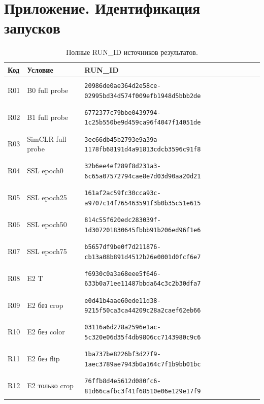 \section*{Приложение. Идентификация запусков}
\begingroup\small{}
\begin{longtable}{@{}l>{\raggedright\arraybackslash}p{3.5cm}p{10.8cm}@{}}
\caption{Полные RUN\_ID источников результатов.}\\
\toprule Код & Условие & RUN\_ID \\ \midrule \endhead
\hypertarget{R01}{R01} & B0 full probe & {\fontsize{8.8}{11}\selectfont\texttt{20986de0ae364d2e58ce-02995bd34d574f009efb1948d5bbb2de}} \\
\hypertarget{R02}{R02} & B1 full probe & {\fontsize{8.8}{11}\selectfont\texttt{6772377c79bbe0439794-1c25b550be9d459ca96f4047f14051de}} \\
\hypertarget{R03}{R03} & SimCLR full probe & {\fontsize{8.8}{11}\selectfont\texttt{3ec66db45b2793e9a39a-1178fb68191d4a91813cdcb3596c91f8}} \\
\hypertarget{R04}{R04} & SSL epoch0 & {\fontsize{8.8}{11}\selectfont\texttt{32b6ee4ef289f8d231a3-6c65a07572794cae8e7d03d90aa20d21}} \\
\hypertarget{R05}{R05} & SSL epoch25 & {\fontsize{8.8}{11}\selectfont\texttt{161af2ac59fc30cca93c-a9707c14f765463591f3b0b35c51e615}} \\
\hypertarget{R06}{R06} & SSL epoch50 & {\fontsize{8.8}{11}\selectfont\texttt{814c55f620edc283039f-1d307201830645fbbb91b206ed96f1e6}} \\
\hypertarget{R07}{R07} & SSL epoch75 & {\fontsize{8.8}{11}\selectfont\texttt{b5657df9be0f7d211876-cb13a08b891d4512b26e0001d0fcf6e7}} \\
\hypertarget{R08}{R08} & E2 T & {\fontsize{8.8}{11}\selectfont\texttt{f6930c0a3a68eee5f646-633b0a71ee11487bbda64c3c2b30dfa7}} \\
\hypertarget{R09}{R09} & E2 без crop & {\fontsize{8.8}{11}\selectfont\texttt{e0d41b4aae60ede11d38-9215f50ca3ca44209c28a2caef62eb66}} \\
\hypertarget{R10}{R10} & E2 без color & {\fontsize{8.8}{11}\selectfont\texttt{03116a6d278a2596e1ac-5c320e06d35f4db9806cc7143980c9c6}} \\
\hypertarget{R11}{R11} & E2 без flip & {\fontsize{8.8}{11}\selectfont\texttt{1ba737be8226bf3d27f9-1aec3789ae7943b0a164c7f1b9bb01bc}} \\
\hypertarget{R12}{R12} & E2 только crop & {\fontsize{8.8}{11}\selectfont\texttt{76ffb8d4e5612d080fc6-81d66cafbc3f41f68510e06e129e17f9}} \\

\end{longtable}
